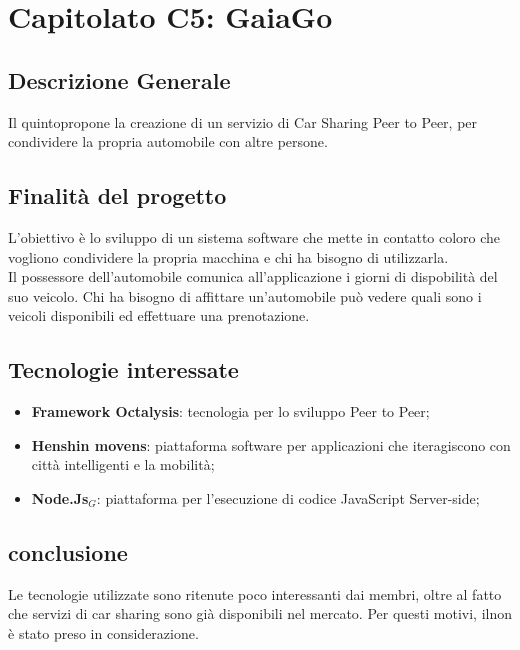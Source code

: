 \chapter{Capitolato C5: GaiaGo}
\section{Descrizione Generale}

Il quintopropone la creazione di un servizio di Car Sharing Peer to Peer, per condividere la propria automobile con altre persone.


\section{Finalit\`a del progetto}
L'obiettivo è lo sviluppo di un sistema software che mette in contatto coloro che vogliono condividere la propria macchina e chi ha bisogno di utilizzarla.\\
Il possessore dell'automobile comunica all'applicazione i giorni di dispobilit\`a del suo veicolo.
Chi ha bisogno di affittare un'automobile può vedere quali sono i veicoli disponibili ed effettuare una prenotazione.

\section{Tecnologie interessate}
\begin{itemize}
\item \textbf{Framework Octalysis}: tecnologia per lo sviluppo Peer to Peer;
\item \textbf{Henshin movens}: piattaforma software per applicazioni che iteragiscono con città intelligenti e la mobilità;
\item \textbf{Node.Js$_{G}$}: piattaforma per l'esecuzione di codice JavaScript Server-side;
\end{itemize}
\section{conclusione}
Le tecnologie utilizzate sono ritenute poco interessanti dai membri, oltre al fatto che servizi di car sharing sono già disponibili nel mercato. Per questi motivi, ilnon è stato preso in considerazione. 